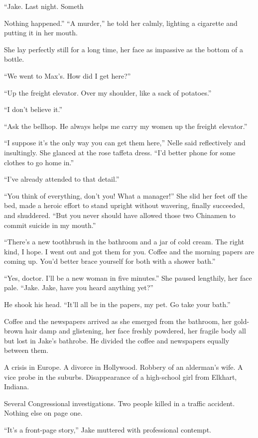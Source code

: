 \documentclass{novel}
\begin{document}
“Jake. Last night. Someth

Nothing happened.” “A murder,” he told her calmly, lighting a cigarette and putting it in her mouth.

She lay perfectly still for a long time, her face as impassive as the bottom of a bottle.

“We went to Max’s. How did I get here?”

“Up the freight elevator. Over my shoulder, like a sack of potatoes.”

“I don’t believe it.”

“Ask the bellhop. He always helps me carry my women up the freight elevator.”

“I suppose it’s the only way you can get them here,” Nelle said reflectively and insultingly. She glanced at the rose taffeta dress. “I’d better phone for some clothes to go home in.”

“I’ve already attended to that detail.”

“You think of everything, don’t you! What a manager!” She slid her feet off the bed, made a heroic effort to stand upright without wavering, finally succeeded, and shuddered. “But you never should have allowed those two Chinamen to commit suicide in my mouth.”

“There’s a new toothbrush in the bathroom and a jar of cold cream. The right kind, I hope. I went out and got them for you. Coffee and the morning papers are coming up. You’d better brace yourself for both with a shower bath.”

“Yes, doctor. I’ll be a new woman in five minutes.” She paused lengthily, her face pale. “Jake. Jake, have you heard anything yet?”

He shook his head. “It’ll all be in the papers, my pet. Go take your bath.”

Coffee and the newspapers arrived as she emerged from the bathroom, her gold-brown hair damp and glistening, her face freshly powdered, her fragile body all but lost in Jake’s bathrobe. He divided the coffee and newspapers equally between them.

A crisis in Europe. A divorce in Hollywood. Robbery of an alderman’s wife. A vice probe in the suburbs. Disappearance of a high-school girl from Elkhart, Indiana.

Several Congressional investigations. Two people killed in a traffic accident. Nothing else on page one.

“It’s a front-page story,” Jake muttered with professional contempt.
\end{document}
